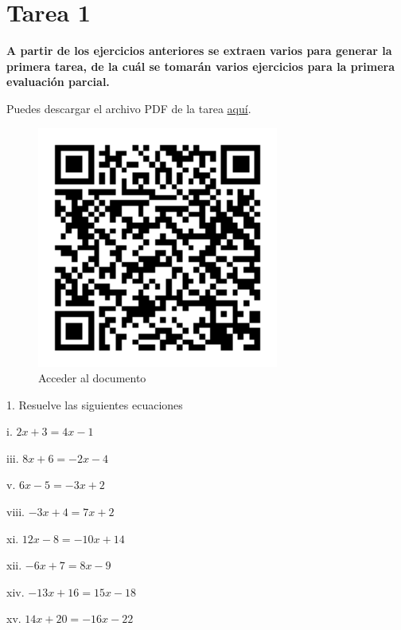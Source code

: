 \documentclass[]{book}
\begin{document}
\chapter{Tarea 1}\label{tarea-1}

\textbf{A partir de los ejercicios anteriores se extraen varios para
generar la primera tarea, de la cuál se tomarán varios ejercicios para
la primera evaluación parcial.}

Puedes descargar el archivo PDF de la tarea
\href{https://github.com/ProfTodoMundo/NotasCalculoDiferencial/blob/PrincipalCD/docs/Tarea1.pdf}{aquí}.

\begin{figure}
\centering
\includegraphics[width=3.12500in]{codigo_qr_tarea.png}
\caption{Acceder al documento}
\end{figure}

\begin{multicols}{2}
1. Resuelve las siguientes ecuaciones

    i. $2x + 3 = 4x - 1$

    iii. $8x + 6 = -2x - 4$

    v. $6x - 5 = -3x + 2$

    viii. $-3x + 4 = 7x + 2$

    xi. $12x - 8 = -10x + 14$

    xii.  $-6x + 7 = 8x - 9$

    xiv. $-13x + 16 = 15x - 18$

    xv. $14x + 20 = -16x - 22$
\end{multicols}
\end{document}
